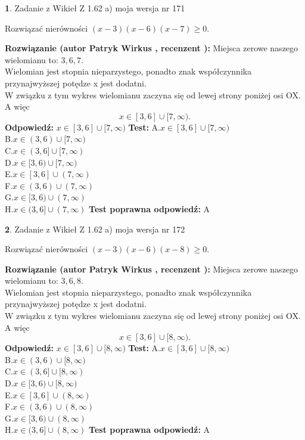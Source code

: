 \documentclass[12pt, a4paper]{article}
\theoremstyle{definition} %
\newtheorem{zad}{}
\newcommand{\zadStart}[1]{\begin{zad}#1\newline}
\newcommand{\zadStop}{\end{zad}}
\newcommand{\rozwStart}[2]{\noindent \textbf{Rozwiązanie (autor #1 , recenzent #2): }\newline}
\newcommand{\rozwStop}{\newline}
\newcommand{\odpStart}{\noindent \textbf{Odpowiedź:}\newline}
\newcommand{\odpStop}{\newline}
\newcommand{\testStart}{\noindent \textbf{Test:}\newline}
\newcommand{\testStop}{\newline}
\newcommand{\kluczStart}{\noindent \textbf{Test poprawna odpowiedź:}\newline}
\newcommand{\kluczStop}{\newline}
\begin{document}
\zadStart{Zadanie z Wikieł Z 1.62 a) moja wersja nr 171}

Rozwiązać nierówności $(x-3)(x-6)(x-7)\ge0$.
\zadStop
\rozwStart{Patryk Wirkus}{}
Miejsca zerowe naszego wielomianu to: $3, 6, 7$.\\
Wielomian jest stopnia nieparzystego, ponadto znak współczynnika przy\linebreak najwyższej potędze x jest dodatni.\\ W związku z tym wykres wielomianu zaczyna się od lewej strony poniżej osi OX. A więc $$x \in [3,6] \cup [7,\infty).$$
\rozwStop
\odpStart
$x \in [3,6] \cup [7,\infty)$
\odpStop
\testStart
A.$x \in [3,6] \cup [7,\infty)$\\
B.$x \in (3,6) \cup [7,\infty)$\\
C.$x \in (3,6] \cup [7,\infty)$\\
D.$x \in [3,6) \cup [7,\infty)$\\
E.$x \in [3,6] \cup (7,\infty)$\\
F.$x \in (3,6) \cup (7,\infty)$\\
G.$x \in [3,6) \cup (7,\infty)$\\
H.$x \in (3,6] \cup (7,\infty)$
\testStop
\kluczStart
A
\kluczStop



\zadStart{Zadanie z Wikieł Z 1.62 a) moja wersja nr 172}

Rozwiązać nierówności $(x-3)(x-6)(x-8)\ge0$.
\zadStop
\rozwStart{Patryk Wirkus}{}
Miejsca zerowe naszego wielomianu to: $3, 6, 8$.\\
Wielomian jest stopnia nieparzystego, ponadto znak współczynnika przy\linebreak najwyższej potędze x jest dodatni.\\ W związku z tym wykres wielomianu zaczyna się od lewej strony poniżej osi OX. A więc $$x \in [3,6] \cup [8,\infty).$$
\rozwStop
\odpStart
$x \in [3,6] \cup [8,\infty)$
\odpStop
\testStart
A.$x \in [3,6] \cup [8,\infty)$\\
B.$x \in (3,6) \cup [8,\infty)$\\
C.$x \in (3,6] \cup [8,\infty)$\\
D.$x \in [3,6) \cup [8,\infty)$\\
E.$x \in [3,6] \cup (8,\infty)$\\
F.$x \in (3,6) \cup (8,\infty)$\\
G.$x \in [3,6) \cup (8,\infty)$\\
H.$x \in (3,6] \cup (8,\infty)$
\testStop
\kluczStart
A
\kluczStop
\end{document}
